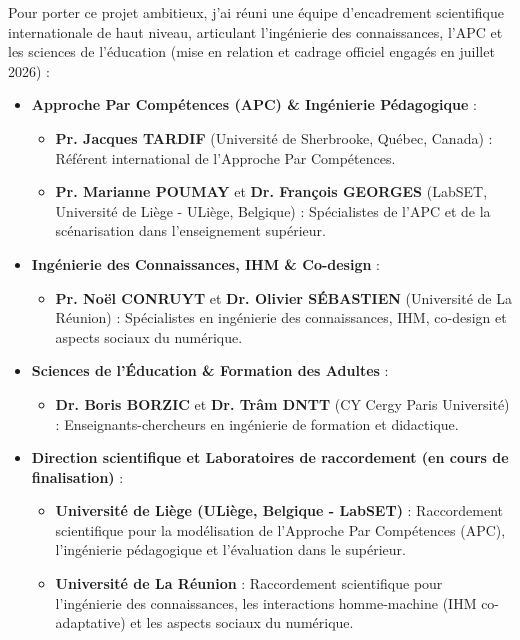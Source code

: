 Pour porter ce projet ambitieux, j'ai réuni une équipe d'encadrement scientifique internationale de haut niveau, articulant l'ingénierie des connaissances, l'APC et les sciences de l'éducation (mise en relation et cadrage officiel engagés en juillet 2026) :

\begin{itemize}[leftmargin=*]
    \item \textbf{Approche Par Compétences (APC) \& Ingénierie Pédagogique} :
    \begin{itemize}
        \item \textbf{Pr. Jacques TARDIF} (Université de Sherbrooke, Québec, Canada) : Référent international de l'Approche Par Compétences.
        \item \textbf{Pr. Marianne POUMAY} et \textbf{Dr. François GEORGES} (LabSET, Université de Liège - ULiège, Belgique) : Spécialistes de l'APC et de la scénarisation dans l'enseignement supérieur.
    \end{itemize}
    \item \textbf{Ingénierie des Connaissances, IHM \& Co-design} :
    \begin{itemize}
        \item \textbf{Pr. Noël CONRUYT} et \textbf{Dr. Olivier SÉBASTIEN} (Université de La Réunion) : Spécialistes en ingénierie des connaissances, IHM, co-design et aspects sociaux du numérique.
    \end{itemize}
    \item \textbf{Sciences de l'Éducation \& Formation des Adultes} :
    \begin{itemize}
        \item \textbf{Dr. Boris BORZIC} et \textbf{Dr. Trâm DNTT} (CY Cergy Paris Université) : Enseignants-chercheurs en ingénierie de formation et didactique.
    \end{itemize}
    \item \textbf{Direction scientifique et Laboratoires de raccordement (en cours de finalisation)} :
    \begin{itemize}
        \item \textbf{Université de Liège (ULiège, Belgique - LabSET)} : Raccordement scientifique pour la modélisation de l'Approche Par Compétences (APC), l'ingénierie pédagogique et l'évaluation dans le supérieur.
        \item \textbf{Université de La Réunion} : Raccordement scientifique pour l'ingénierie des connaissances, les interactions homme-machine (IHM co-adaptative) et les aspects sociaux du numérique.
    \end{itemize}
\end{itemize}

